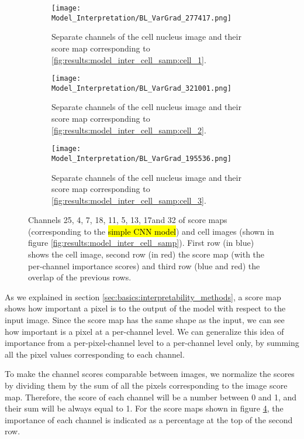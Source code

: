   \begin{figure}
    \centering
    \begin{subfigure}[b]{\linewidth}
      \texttt{[image: Model\_Interpretation/BL\_VarGrad\_277417.png]}
      \caption{Separate channels of the cell nucleus image and their score map corresponding to \ref{fig:results:model_inter_cell_samp:cell_1}.}
      \label{fig:results:model_inter:sm:cell_1}
    \end{subfigure}%
    \vspace{3mm}
    \begin{subfigure}[b]{\linewidth}
      \texttt{[image: Model\_Interpretation/BL\_VarGrad\_321001.png]}
      \caption{Separate channels of the cell nucleus image and their score map corresponding to \ref{fig:results:model_inter_cell_samp:cell_2}.}
      \label{fig:results:model_inter:sm:cell_2}
    \end{subfigure}%
    \vspace{3mm}
    \begin{subfigure}[b]{\linewidth}
      \texttt{[image: Model\_Interpretation/BL\_VarGrad\_195536.png]}
      \caption{Separate channels of the cell nucleus image and their score map corresponding to \ref{fig:results:model_inter_cell_samp:cell_3}.}
      \label{fig:results:model_inter:sm:cell_3}
    \end{subfigure}
    \caption{Channels 25, 4, 7, 18, 11, 5, 13, 17and 32 of score maps (corresponding to the \hl{simple CNN model}) and cell images (shown in figure \ref{fig:results:model_inter_cell_samp}). First row (in blue) shows the cell image, second row (in red) the score map (with the per-channel importance scores) and third row (blue and red) the overlap of the previous rows.}
    \label{fig:results:model_inter:sm}
  \end{figure}

As we explained in section \ref{sec:basics:interpretability_methods}, a score map shows how important a pixel is to the output of the model with respect to the input image. Since the score map has the same shape as the input, we can see how important is a pixel at a per-channel level.
We can generalize this idea of importance from a per-pixel-channel level to a per-channel level only, by summing all the pixel values corresponding to each channel.

To make the channel scores comparable between images, we normalize the scores by dividing them by the sum of all the pixels corresponding to the image score map. Therefore, the score of each channel will be a number between 0 and 1, and their sum will be always equal to 1. For the score maps shown in figure \ref{fig:results:model_inter:sm}, the importance of each channel is indicated as a percentage at the top of the second row.

